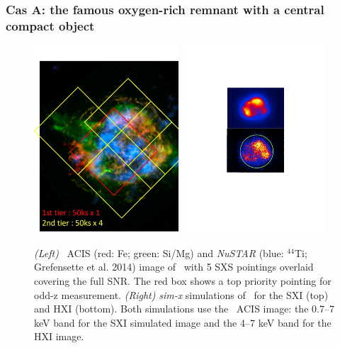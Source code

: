\documentclass[11pt,a4paper]{article}
\begin{document}
{\subsubsection{Cas A: the famous oxygen-rich remnant with a central 
compact object}\label{subsec:casa}


 \begin{figure}
  \begin{center}
  \includegraphics[height=2.75in]{AH_CasA_FOV_NuSTAR_rev3.pdf}
     \includegraphics[height=2.75in,clip,trim=189 255 180 175]{casa_imagesims}
  \caption{{\it (Left)} \chandra\ ACIS (red: Fe; green: Si/Mg) and {\it NuSTAR} (blue: $^{44}$Ti; Grefensette et al. 2014) 
  image of \casa\  with 5 SXS pointings overlaid covering the full SNR.
  The red box shows a top priority pointing for odd-z measurement.
 {\it (Right)} \textit{sim-x}   simulations of \casa\ for the SXI (top) and HXI (bottom).  Both
    simulations use the \chandra\ ACIS image: the 0.7--7 keV band for
    the SXI simulated image and the 4--7 keV band for the HXI image. }
  \label{casa:ptgs}
  \end{center}
\end{figure}

}
\end{document}
